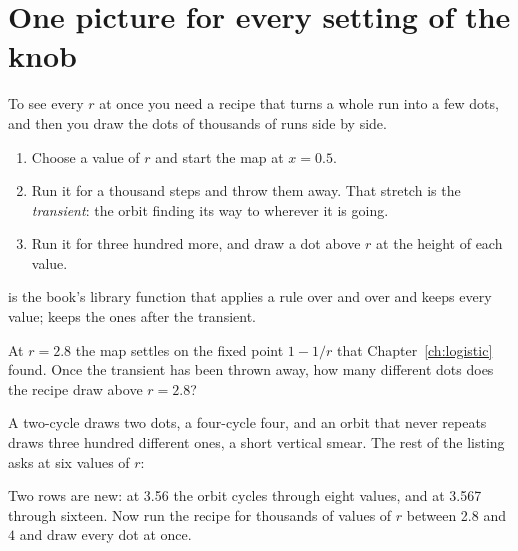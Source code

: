 \section{One picture for every setting of the knob}
\label{sec:ch08-picture}

\noindent
To see every $r$ at once you need a recipe that turns a whole run into a few
dots, and then you draw the dots of thousands of runs side by side.

\begin{enumerate}
\item Choose a value of $r$ and start the map at $x = \num{0.5}$.
\item Run it for a thousand steps and throw them away. That stretch is the
  \emph{transient}: the orbit finding its way to wherever it is going.
\item Run it for three hundred more, and draw a dot above $r$ at the height
  of each value.
\end{enumerate}


\noindent
{} is the book's library function that applies a rule over and
over and keeps every value;  keeps the ones after the
transient.

\begin{think}
At $r = \num{2.8}$ the map settles on the fixed point $1 - 1/r$ that
Chapter~\ref{ch:logistic} found. Once the transient has been thrown away, how
many different dots does the recipe draw above $r = \num{2.8}$?
\end{think}
A two-cycle draws two dots, a four-cycle four, and an orbit that never
repeats draws three hundred different ones, a short vertical smear. The rest
of the listing asks at six values of $r$:


\noindent
Two rows are new: at \num{3.56} the orbit cycles through eight values, and
at \num{3.567} through sixteen. Now run the recipe for thousands of values of
$r$ between \num{2.8} and $4$ and draw every dot at once.


